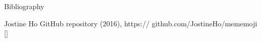 \documentclass[compress]{beamer}
\begin{document}
\begin{frame}{Bibliography}
    \begin{thebibliography}{10}

\beamertemplatearticlebibitems
      Jostine Ho       
      \newblock {}
      \newblock GitHub repository (2016), https:// github.com/JostineHo/mememoji [\href{https:// github.com/JostineHo/mememoji}{\faGithub}]


    \end{thebibliography}
\end{frame}




\closingtitle


\end{document}
